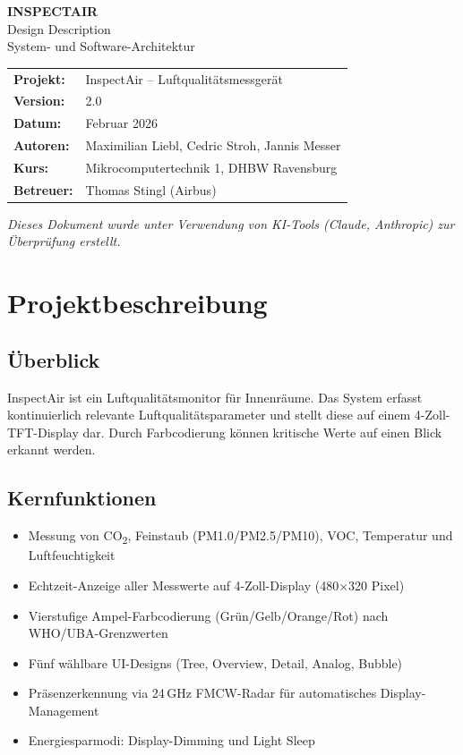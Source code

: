 \documentclass[a4paper,11pt]{article}
\begin{document}
\begin{center}
{\LARGE\textbf{INSPECTAIR}}\\[0.3cm]
{\Large Design Description}\\[0.3cm]
{\large System- und Software-Architektur}\\[0.5cm]
\begin{tabular}{ll}
\textbf{Projekt:} & InspectAir -- Luftqualitätsmessgerät \\
\textbf{Version:} & 2.0 \\
\textbf{Datum:} & Februar 2026 \\
\textbf{Autoren:} & Maximilian Liebl, Cedric Stroh, Jannis Messer \\
\textbf{Kurs:} & Mikrocomputertechnik 1, DHBW Ravensburg \\
\textbf{Betreuer:} & Thomas Stingl (Airbus) \\
\end{tabular}
\end{center}

\vspace{0.5cm}
\noindent\textit{Dieses Dokument wurde unter Verwendung von KI-Tools (Claude, Anthropic) zur Überprüfung erstellt.}
\vspace{0.3cm}

\tableofcontents
\newpage

\section{Projektbeschreibung}

\subsection{Überblick}
InspectAir ist ein Luftqualitätsmonitor für Innenräume. Das System erfasst kontinuierlich relevante Luftqualitätsparameter und stellt diese auf einem 4-Zoll-TFT-Display dar. Durch Farbcodierung können kritische Werte auf einen Blick erkannt werden.

\subsection{Kernfunktionen}
\begin{itemize}[nosep]
\item Messung von CO\textsubscript{2}, Feinstaub (PM1.0/PM2.5/PM10), VOC, Temperatur und Luftfeuchtigkeit
\item Echtzeit-Anzeige aller Messwerte auf 4-Zoll-Display (480$\times$320 Pixel)
\item Vierstufige Ampel-Farbcodierung (Grün/Gelb/Orange/Rot) nach WHO/UBA-Grenzwerten
\item Fünf wählbare UI-Designs (Tree, Overview, Detail, Analog, Bubble)
\item Präsenzerkennung via 24\,GHz FMCW-Radar für automatisches Display-Management
\item Energiesparmodi: Display-Dimming und Light Sleep
\end{itemize}
\end{document}
